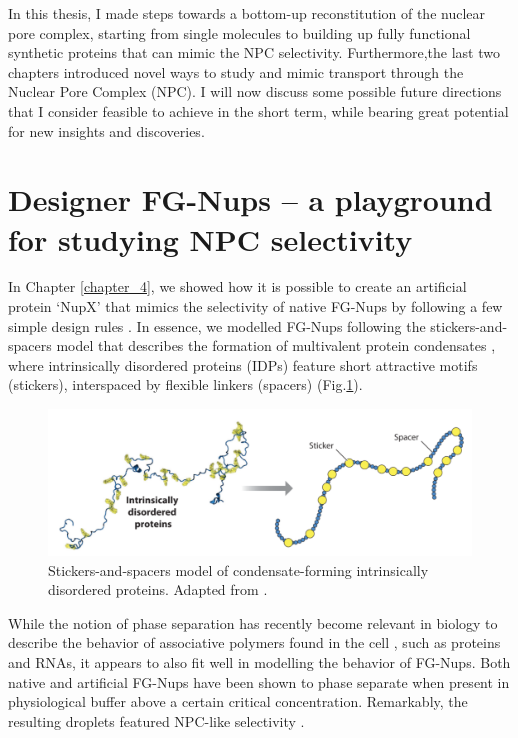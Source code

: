 In this thesis, I made steps towards a bottom-up reconstitution of the nuclear pore complex, starting from single molecules to building up fully functional synthetic proteins that can mimic the NPC selectivity. Furthermore,the last two chapters introduced novel ways to study and mimic transport through the Nuclear Pore Complex (NPC). I will now discuss some possible future directions that I consider feasible to achieve in the short term, while bearing great potential for new insights and discoveries.
\section{Designer FG-Nups – a playground for studying NPC selectivity}
In Chapter \ref{chapter_4}, we showed how it is possible to create an artificial protein `NupX' that mimics the selectivity of native FG-Nups by following a few simple design rules \cite{Fragasso2021}. In essence, we modelled FG-Nups following the stickers-and-spacers model that describes the formation of multivalent protein condensates \cite{Choi2020}, where intrinsically disordered proteins (IDPs) feature short attractive motifs (stickers), interspaced by flexible linkers (spacers) (Fig.\ref{fig:fig8.1}).
\begin{figure}[!htbp]
	\centering
	\includegraphics[width=1\linewidth]{figures/Figure8.1.pdf}
	\caption{Stickers-and-spacers model of condensate-forming intrinsically disordered proteins. Adapted from \cite{Choi2020}.}
	\label{fig:fig8.1}
\end{figure}

\noindent While the notion of phase separation has recently become relevant in biology to describe the behavior of associative polymers found in the cell \cite{Alberti2017}, such as proteins and RNAs, it appears to also fit well in modelling the behavior of FG-Nups. Both native and artificial FG-Nups have been shown to phase separate when present in physiological buffer above a certain critical concentration. Remarkably, the resulting droplets featured NPC-like selectivity \cite{Schmidt2015,Celetti2019,Ng2021}. 

